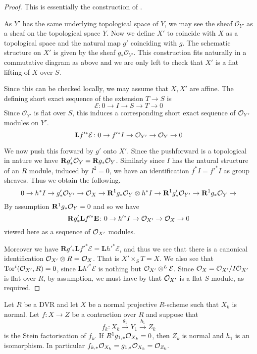 \begin{proof}
	This is essentially the construction of \cite[Theorem 3.1]{cynk2009small}.
	
	As $Y'$ has the same underlying topological space of $Y$, we may see the sheaf $\mathcal{O}_{Y'}$ as a sheaf on the topological space $Y$. 	
	Now we define $X'$ to coincide with $X$ as a topological space and the natural map $g'$ coinciding with $g$. The schematic structure on $X'$ is given by the sheaf $g_*\mathcal{O}_{Y'}$. 
	This construction fits naturally in a commutative diagram as above and we are only left to check that $X'$ is a flat lifting of $X$ over $S$.
	
	Since this can be checked locally, we may assume that $X, X'$ are affine.
	The defining short exact sequence of the extension $T \to S$ is
	\[\mathcal{E} \colon 0 \to I \to S \to T \to 0 \]
	Since $\mathcal{O}_{Y'}$ is flat over $S$, this induces a corresponding short exact sequence of $\ox[Y']$ modules on $Y'$.
	\[ \mathbf{L}f'^{*}\mathcal{E} \colon 0 \to f'^{*}I \to \ox[Y'] \to \ox[Y] \to 0 \]
	
	We now push this forward by $g'$ onto $X'$. Since the pushforward is a topological in nature we have $\mathbf{R}g'_{*}\ox[Y]=\mathbf{R}g_{*}\ox[Y]$. Similarly since $I$ has the natural structure of an $R$ module, induced by $I^{2}=0$, we have an identification $f^{*}I=f'^{*}I$ as group sheaves.
	Thus we obtain the following.
	\[0 \to h^{*}I \to g'_{*}\ox[Y'] \to \ox[X] \to \mathbf{R}^{1}g_{*}\ox[Y] \otimes h^{*}I \to \mathbf{R}^{1}g'_{*}\ox[Y'] \to \mathbf{R}^{1}g_{*}\ox[Y] \to \] 
	By assumption $\mathbf{R}^{1}g_{*}\ox[Y]=0$ and so we have
	\[\mathbf{R}g'_{*}\mathbf{L}f'^{*}\mathbf{E}\colon 0 \to h'^{*}I \to \ox[X'] \to \ox[X] \to 0\]
	viewed here as a sequence of $\ox[X']$ modules.
	
	Moreover we have $\mathbf{R}g'_{*}\mathbf{L}f'^{*}\mathcal{E}=\mathbf{L}h'^{*}\mathcal{E}$, and thus we see that there is a canonical identification $\ox[X']\otimes R= \ox[X]$. That is $X' \times_{S} T= X$. We also see that $\textup{Tor}^{i}(\ox[X'], R)=0$, since $\mathbf{L}h'^{*}\mathcal{E}$ is nothing but $\ox[X'] \otimes^{L} \mathcal{E}$. Since $\ox= \ox[X']/ I \ox[X']$ is flat over $R$, by assumption, we must have by \cite[\href{https://stacks.math.columbia.edu/tag/0AS8}{Tag 0AS8}]{stacks-project} that $\ox[X']$ is a flat $S$ module, as required.
	
\end{proof}

\begin{theorem}\label{adj-push}
	Let $R$ be a DVR and let $X$ be a normal projective $R$-scheme such that $X_{k}$ is normal. 
	Let $f \colon X \to Z$ be a contraction over $R$ and suppose that $$f_{k}\colon X_{k} \xrightarrow{g_{1}} Y_{1} \xrightarrow{h_{1}} Z_{k}$$ is the Stein factorisation of $f_{k}$. If $R^{1}g_{1,*} \ox[X_{k}]=0$, then $Z_k$ is normal and $h_{1}$ is an isomorphism. In particular $f_{k,*}\ox[X_{k}]=g_{1,*}\ox[X_{k}]=\ox[Z_{k}].$
\end{theorem}

